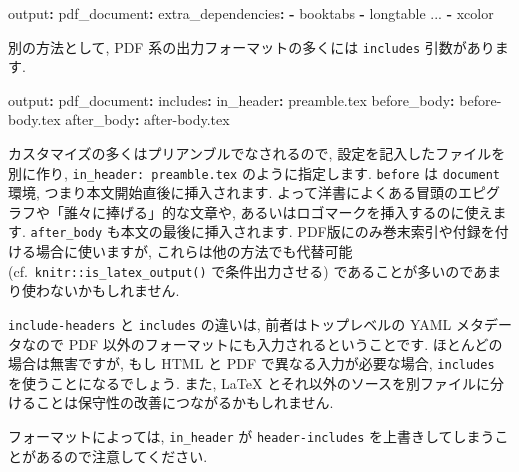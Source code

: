 \documentclass[
]{bxjsarticle}
\newenvironment{Shaded}{\begin{snugshade}}{\end{snugshade}}
\newcommand{\AttributeTok}[1]{\textcolor[rgb]{0.77,0.63,0.00}{#1}}
\newcommand{\FunctionTok}[1]{\textcolor[rgb]{0.00,0.00,0.00}{#1}}
\newcommand{\KeywordTok}[1]{\textcolor[rgb]{0.13,0.29,0.53}{\textbf{#1}}}
\newenvironment{infobox}[1]{\begin{itemize}\renewcommand{\labelitemi}{\raisebox{-.7\height}[0pt][0pt]{%
  {\setkeys{Gin}{width=3em,keepaspectratio}\texttt{[image: \_latex/\_img/\#1]}}}}
  \setlength{\fboxsep}{1em}
  \begin{greyblock}
  \item
  }{\end{greyblock}\end{itemize}
}
\begin{document}
\begin{Shaded}
\begin{Highlighting}[numbers=left,,]
\FunctionTok{output}\KeywordTok{:}
\AttributeTok{  }\FunctionTok{pdf\_document}\KeywordTok{:}
\AttributeTok{    }\FunctionTok{extra\_dependencies}\KeywordTok{:}
\AttributeTok{      }\KeywordTok{{-}}\AttributeTok{ booktabs}
\AttributeTok{      }\KeywordTok{{-}}\AttributeTok{ longtable}
\AttributeTok{      ...}
\AttributeTok{      }\KeywordTok{{-}}\AttributeTok{ xcolor}
\end{Highlighting}
\end{Shaded}

別の方法として, PDF 系の出力フォーマットの多くには \texttt{includes} 引数があります.

\begin{Shaded}
\begin{Highlighting}[numbers=left,,]
\FunctionTok{output}\KeywordTok{:}
\AttributeTok{  }\FunctionTok{pdf\_document}\KeywordTok{:}
\AttributeTok{    }\FunctionTok{includes}\KeywordTok{:}
\AttributeTok{      }\FunctionTok{in\_header}\KeywordTok{:}\AttributeTok{ preamble.tex}
\AttributeTok{      }\FunctionTok{before\_body}\KeywordTok{:}\AttributeTok{ before{-}body.tex}
\AttributeTok{      }\FunctionTok{after\_body}\KeywordTok{:}\AttributeTok{ after{-}body.tex}
\end{Highlighting}
\end{Shaded}

カスタマイズの多くはプリアンブルでなされるので, 設定を記入したファイルを別に作り, \texttt{in\_header:\ preamble.tex} のように指定します. \texttt{before} は \texttt{document} 環境, つまり本文開始直後に挿入されます. よって洋書によくある冒頭のエピグラフや「誰々に捧げる」的な文章や, あるいはロゴマークを挿入するのに使えます. \texttt{after\_body} も本文の最後に挿入されます. PDF版にのみ巻末索引や付録を付ける場合に使いますが, これらは他の方法でも代替可能 (cf.~\texttt{knitr::is\_latex\_output()} で条件出力させる) であることが多いのであまり使わないかもしれません.

\texttt{include-headers} と \texttt{includes} の違いは, 前者はトップレベルの YAML メタデータなので PDF 以外のフォーマットにも入力されるということです. ほとんどの場合は無害ですが, もし HTML と PDF で異なる入力が必要な場合, \texttt{includes} を使うことになるでしょう. また, LaTeX とそれ以外のソースを別ファイルに分けることは保守性の改善につながるかもしれません.

\begin{infobox}{tip}
フォーマットによっては, \texttt{in\_header} が \texttt{header-includes} を上書きしてしまうことがあるので注意してください.

\end{infobox}
\end{document}
